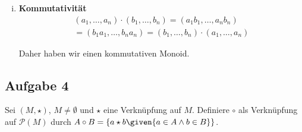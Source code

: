 \begin{enumerate}[a)]
\begin{enumerate}[i)]
      \item \textbf{Kommutativität}
        \begin{align*}
          (a_1, \ldots, a_n) \cdot (b_1, \ldots, b_n) = (a_1 b_1, \ldots, a_n b_n) \\
          = (b_1 a_1 , \ldots, b_n a_n) = (b_1, \ldots, b_n) \cdot (a_1, \ldots, a_n)
        \end{align*}

      Daher haben wir einen kommutativen Monoid.

    \end{enumerate}
\end{enumerate}
%
%
%
\subsection*{Aufgabe 4} %
\label{sub:aufgabe_4}

Sei $(M, \star)$, $M \neq \emptyset$ und $\star$ eine Verknüpfung auf $M$. Definiere $\circ$ als Verknüpfung auf $\mathcal{P}(M)$ durch $  A \circ B = \{  a \star b \given{a \in A \land b \in B} \} $.

